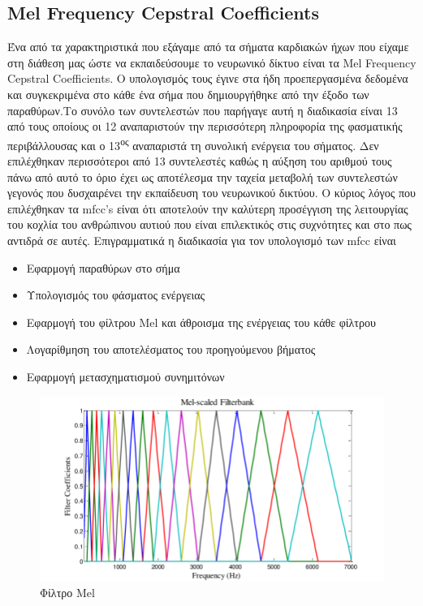 \subsection{Mel Frequency Cepstral Coefficients}
Ένα από τα χαρακτηριστικά που εξάγαμε από τα σήματα καρδιακών ήχων που είχαμε
στη διάθεση μας ώστε να εκπαιδεύσουμε το νευρωνικό δίκτυο είναι τα Mel Frequency
Cepstral Coefficients. Ο υπολογισμός τους έγινε στα ήδη προεπεργασμένα δεδομένα
και συγκεκριμένα στο κάθε ένα σήμα που δημιουργήθηκε από την έξοδο των
παραθύρων.Το συνόλο των συντελεστών που παρήγαγε αυτή η διαδικασία είναι 13 από
τους οποίους οι 12 αναπαριστούν την περισσότερη πληροφορία της φασματικής
περιβάλλουσας και ο 13\textsuperscript{ος} αναπαριστά τη συνολική ενέργεια του
σήματος. Δεν επιλέχθηκαν περισσότεροι από 13 συντελεστές καθώς η αύξηση του
αριθμού τους πάνω από αυτό το όριο έχει ως αποτέλεσμα την ταχεία μεταβολή των
συντελεστών γεγονός που δυσχαιρένει την εκπαίδευση του νευρωνικού δικτύου. Ο
κύριος λόγος που επιλέχθηκαν τα mfcc's είναι ότι αποτελούν την καλύτερη
προσέγγιση της λειτουργίας του κοχλία του ανθρώπινου αυτιού που είναι
επιλεκτικός στις συχνότητες και στο πως αντιδρά σε αυτές. Επιγραμματικά η
διαδικασία για τον υπολογισμό των mfcc είναι

\begin{center}
	\begin{itemize}
		\item Εφαρμογή παραθύρων στο σήμα
		\item Υπολογισμός του φάσματος ενέργειας
		\item Εφαρμογή του φίλτρου Mel και άθροισμα της ενέργειας του κάθε φίλτρου
		\item Λογαρίθμηση του αποτελέσματος του προηγούμενου βήματος
		\item Εφαρμογή μετασχηματισμού συνημιτόνων
	\end{itemize}
\end{center}

\begin{figure}
	\includegraphics[width=\textwidth]{images/MelFilter.png}
	\caption{Φίλτρο Mel}
	\label{melfilter}
\end{figure}


